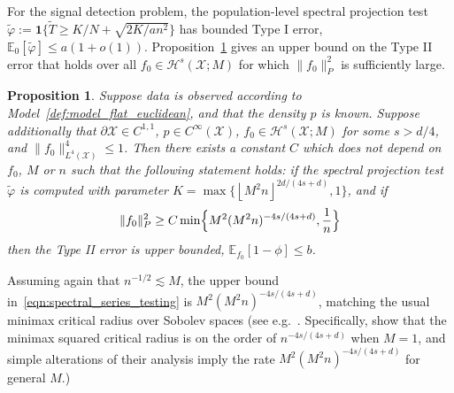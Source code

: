 \documentclass[aos]{imsart}
\theoremstyle{plain}
\newtheorem{proposition}{Proposition}
\theoremstyle{definition}
\theoremstyle{remark}
\newcommand{\Ebb}{\mathbb{E}}
\newcommand{\wt}[1]{\widetilde{#1}}
\newcommand{\mc}[1]{\mathcal{#1}}
\newcommand{\floor}[1]{\left\lfloor #1 \right\rfloor}
\newcommand{\1}{\mathbf{1}}
\begin{document}
For the signal detection problem, the population-level spectral projection test $\wt{\varphi} := \1\{\wt{T} \geq K/N + \sqrt{2K/an^2}\}$ has bounded Type I error, $\Ebb_{0}[\wt{\varphi}] \leq a (1 + o(1))$. Proposition~\ref{prop:spectral_series_testing} gives an upper bound on the Type II error that holds over all $f_0 \in \mc{H}^s(\mc{X};M)$ for which $\|f_0\|_P^2$ is sufficiently large.
\begin{proposition}
	\label{prop:spectral_series_testing}
	Suppose data is observed according to Model~\ref{def:model_flat_euclidean}, and that the density $p$ is known.  Suppose additionally that $\partial \mc{X} \in C^{1,1}$, $p \in C^{\infty}(\mc{X})$, $f_0 \in \mc{H}^{s}(\mc{X};M)$ for some $s > d/4$, and $\|f_0\|_{L^4(\mc{X})}^4 \leq 1$. Then there exists a constant $C$ which does not depend on $f_0$, $M$ or $n$ such that the following statement holds: if the spectral projection test $\wt{\varphi}$ is computed with parameter $K = \max\{\floor{M^2n}^{2d/(4s + d)},1\}$, and if
	\begin{equation}
	\label{eqn:spectral_series_testing}
	\|f_0\|_P^2 \geq C\min\Bigl\{M^2(M^2n)^{-4s/(4s + d)}, \frac{1}{n}\Bigr\}
	\end{equation}
	then the Type II error is upper bounded, $\Ebb_{f_0}[1 - \phi] \leq b$.
\end{proposition}
Assuming again that $n^{-1/2} \lesssim M$, the upper bound in~\eqref{eqn:spectral_series_testing} is $M^2(M^2n)^{-4s/(4s + d)}$, matching the usual minimax critical radius over Sobolev spaces (see e.g.~\cite{guerre02,ingster2009,ingster2012}. Specifically, \cite{ingster2009} show that the minimax squared critical radius is on the order of $n^{-4s/(4s + d)}$ when $M = 1$, and simple alterations of their analysis imply the rate $M^2(M^2n)^{-4s/(4s + d)}$ for general $M$.) 
\end{document}
